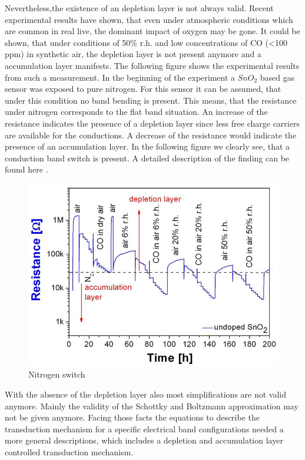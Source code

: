 \documentclass[11pt]{article}
\begin{document}
Nevertheless,the existence of an depletion layer is not always valid.
Recent experimental results have shown, that even under atmospheric
conditions which are common in real live, the dominant impact of oxygen
may be gone. It could be shown, that under conditions of 50\% r.h. and
low concentrations of CO (\textless100 ppm) in synthetic air, the
depletion layer is not present anymore and a accumulation layer
manifests. The following figure shows the experimental results from such
a measurement. In the beginning of the experiment a \(SnO_2\) based gas
sensor was exposed to pure nitrogen. For this sensor it can be assumed,
that under this condition no band bending is present. This means, that
the resistance under nitrogen corresponds to the flat band situation. An
increase of the resistance indicates the presence of a depletion layer
since less free charge carriers are available for the conductions. A
decrease of the resistance would indicate the presence of an
accumulation layer. In the following figure we clearly see, that a
conduction band switch is present. A detailed description of the finding
can be found here \cite{Barsan2015}.

\begin{figure}
\centering
\includegraphics{media/pics/external_plots/nitroline_switch_julia.jpg}
\caption{Nitrogen switch}
\end{figure}

    With the absence of the depletion layer also most simplifications are
not valid anymore. Mainly the validity of the Schottky and Boltzmann
approximation may not be given anymore. Facing those facts the equations
to describe the transduction mechanism for a specific electrical band
configurations needed a more general descriptions, which includes a
depletion and accumulation layer controlled transduction mechanism.
\end{document}
